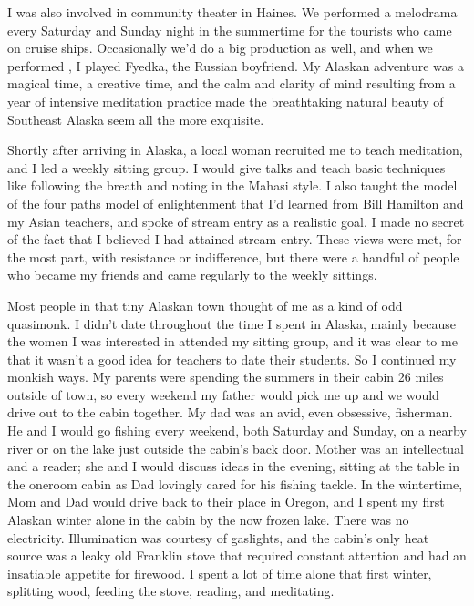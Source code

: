 \documentclass[a5paper,10pt,english]{book}
\begin{document}
\sphinxAtStartPar
I was also involved in community theater in Haines. We performed a
melodrama every Saturday and Sunday night in the summertime for the
tourists who came on cruise ships. Occasionally we’d do a big production
as well, and when we performed , I played Fyedka,
the Russian boyfriend. My Alaskan adventure was a magical time, a
creative time, and the calm and clarity of mind resulting from a year of
intensive meditation practice made the breathtaking natural beauty of
Southeast Alaska seem all the more exquisite.

\sphinxAtStartPar
Shortly after arriving in Alaska, a local woman recruited me to teach
meditation, and I led a weekly sitting group. I would give talks and
teach basic techniques like following the breath and noting in the
Mahasi style. I also taught the model of the four paths model of
enlightenment that I’d learned from Bill Hamilton and my Asian teachers,
and spoke of stream entry as a realistic goal. I made no secret of the
fact that I believed I had attained stream entry. These views were met,
for the most part, with resistance or indifference, but there were a
handful of people who became my friends and came regularly to the weekly
sittings.

\sphinxAtStartPar
Most people in that tiny Alaskan town thought of me as a kind of odd
quasi\sphinxhyphen{}monk. I didn’t date throughout the time I spent in Alaska, mainly
because the women I was interested in attended my sitting group, and it
was clear to me that it wasn’t a good idea for teachers to date their
students. So I continued my monkish ways. My parents were spending the
summers in their cabin 26 miles outside of town, so every weekend my
father would pick me up and we would drive out to the cabin together. My
dad was an avid, even obsessive, fisherman. He and I would go fishing
every weekend, both Saturday and Sunday, on a nearby river or on the
lake just outside the cabin’s back door. Mother was an intellectual and
a reader; she and I would discuss ideas in the evening, sitting at the
table in the one\sphinxhyphen{}room cabin as Dad lovingly cared for his fishing
tackle. In the wintertime, Mom and Dad would drive back to their place
in Oregon, and I spent my first Alaskan winter alone in the cabin by the
now frozen lake. There was no electricity. Illumination was courtesy of
gaslights, and the cabin’s only heat source was a leaky old Franklin
stove that required constant attention and had an insatiable appetite
for firewood. I spent a lot of time alone that first winter, splitting
wood, feeding the stove, reading, and meditating.
\end{document}
